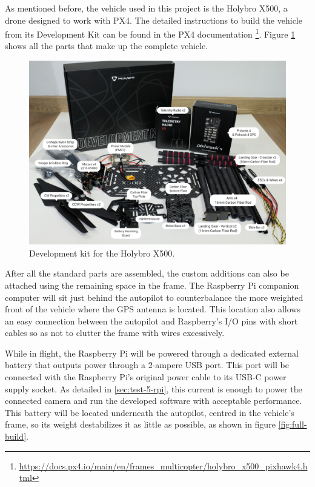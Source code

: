 

As mentioned before, the vehicle used in this project is the Holybro X500, a drone designed to work with PX4.
The detailed instructions to build the vehicle from its Development Kit can be found in the PX4 documentation \footnote{\url{https://docs.px4.io/main/en/frames_multicopter/holybro_x500_pixhawk4.html}}.
Figure \ref{fig:x500-dev-kit} shows all the parts that make up the complete vehicle.

\begin{figure}
  \centering
  \includegraphics[width=.6\textwidth, keepaspectratio]{img/x500-dev-kit.jpg}
  \caption{Development kit for the Holybro X500.}
  \label{fig:x500-dev-kit}
\end{figure}


After all the standard parts are assembled, the custom additions can also be attached using the remaining space in the frame.
The Raspberry Pi companion computer will sit just behind the autopilot to counterbalance the more weighted front of the vehicle where the GPS antenna is located.
This location also allows an easy connection between the autopilot and Raspberry's I/O pins with short cables so as not to clutter the frame with wires excessively.

While in flight, the Raspberry Pi will be powered through a dedicated external battery that outputs power through a 2-ampere USB port.
This port will be connected with the Raspberry Pi's original power cable to its USB-C power supply socket.
As detailed in \ref{sec:test-5-rpi}, this current is enough to power the connected camera and run the developed software with acceptable performance.
This battery will be located underneath the autopilot, centred in the vehicle's frame, so its weight destabilizes it as little as possible, as shown in figure \ref{fig:full-build}.

